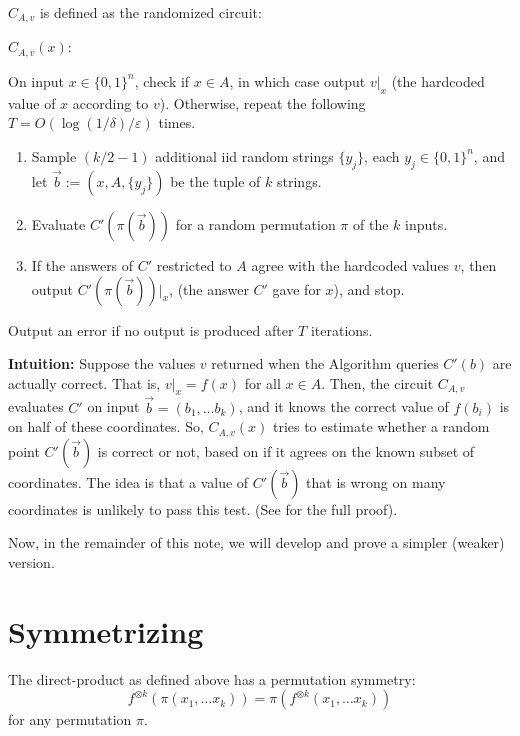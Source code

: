 \documentclass[]{article}
\newcommand{\1}{\mathbb{1}}
\renewcommand{\epsilon}{\varepsilon}
\newcommand{\ox}{\otimes}
\begin{document}
$C_{A, v}$ is defined as the randomized circuit:\\
\begin{mdframed}
    $C_{A, v}(x)$:

On input $x \in \{0, 1\}^n$, check if $x \in A$, in which case output $v|_x$ (the hardcoded
    value of $x$ according to $v$).
    Otherwise, repeat the following $T = O(\log(1/\delta)/\epsilon)$
    times.
\begin{enumerate}
    \item Sample $(k/2 - 1)$ additional iid random strings $\{y_j\}$, each $y_j
        \in \{0, 1\}^n$, and let
        $\vec b := (x, A, \{y_j\})$ be the tuple of $k$ strings.
    \item Evaluate $C'(\pi(\vec b))$ for a random permutation $\pi$ of the $k$
        inputs.
    \item If the answers of $C'$ restricted to $A$ agree with the hardcoded
        values $v$, then output $C'(\pi(\vec b))|_x$, (the answer $C'$ gave for
        $x$), and stop.
\end{enumerate}
Output an error if no output is produced after $T$ iterations.
\end{mdframed}

{\bf Intuition:} Suppose the values $v$ returned when the Algorithm queries $C'(b)$
are actually correct. That is, $v|_x = f(x)$ for all $x \in A$.
Then, the circuit $C_{A, v}$ evaluates $C'$ on input $\vec b = (b_1, \dots
b_k)$, and it knows the correct value of $f(b_i)$ is on half of these
coordinates.
So, $C_{A, v}(x)$ tries to estimate whether a random point
$C'(\vec b)$ is correct or not, based on if it agrees on the known subset of
coordinates. The idea is that a value of $C'(\vec b)$ that is wrong on
many coordinates is unlikely to pass this test.
(See \cite{IJKW} for the full proof).

Now, in the remainder of this note, we will develop and prove a simpler
(weaker) version.

\section{Symmetrizing}
The direct-product as defined above has a permutation symmetry:
$$
f^{\ox k}(\pi(x_1, \dots x_k))
=
\pi(f^{\ox k}(x_1, \dots x_k))
$$
for any permutation $\pi$.
\end{document}
